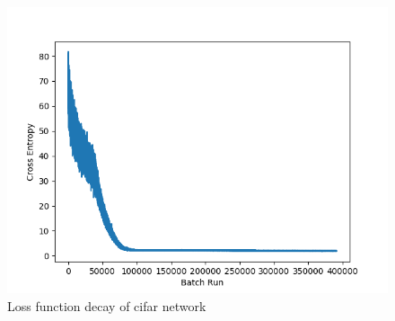\begin{figure}[!htb]
    \centering
    \includegraphics[scale=0.7]{images/full_cifar_train.png}
    \caption{Loss function decay of cifar network}
\end{figure}